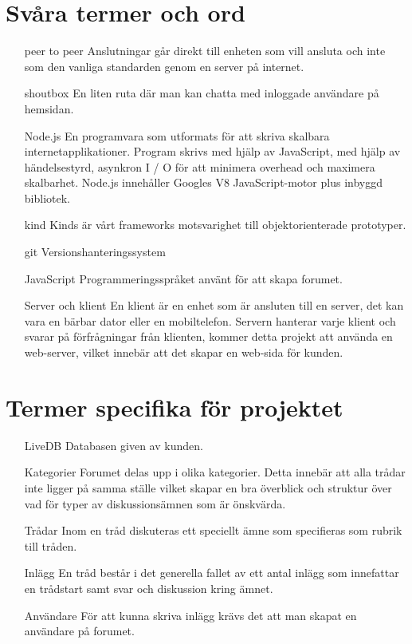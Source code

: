 \documentclass[a4paper, 12pt, titlepage]{article}
\begin{document}
\section{Svåra termer och ord}

\begin{itemize}
	\item[peer to peer] Anslutningar går direkt till enheten som vill ansluta och inte som den vanliga standarden genom en server på internet.
	\item[shoutbox] En liten ruta där man kan chatta med inloggade användare på hemsidan.
	\item[Node.js] En programvara som utformats för att skriva skalbara internetapplikationer. Program skrivs med hjälp av JavaScript, med hjälp av händelsestyrd, asynkron I / O för att minimera overhead och maximera skalbarhet. Node.js innehåller Googles V8 JavaScript-motor plus inbyggd bibliotek.
	\item[kind] Kinds är vårt frameworks motsvarighet till objektorienterade prototyper.
	\item[git] Versionshanteringssystem	
	\item[JavaScript] Programmeringsspråket använt för att skapa forumet.
  	\item[Server och klient] En klient är en enhet som är ansluten till en server, det kan vara en bärbar dator eller en mobiltelefon. Servern hanterar varje klient och svarar på förfrågningar från klienten, kommer detta projekt att använda en web-server, vilket innebär att det skapar en web-sida för kunden.

\end{itemize}

\section{Termer specifika för projektet}

\begin{itemize}
	\item[LiveDB] Databasen given av kunden.
	\item [Kategorier] Forumet delas upp i olika kategorier. Detta innebär att alla trådar inte ligger på samma ställe vilket skapar en bra överblick och struktur över vad för typer av diskussionsämnen som är önskvärda.
	\item [Trådar] Inom en tråd diskuteras ett speciellt ämne som specifieras som rubrik till tråden.
	\item [Inlägg] En tråd består i det generella fallet av ett antal inlägg som innefattar en trådstart samt svar och diskussion kring ämnet.
	\item [Användare] För att kunna skriva inlägg krävs det att man skapat en
användare på forumet.
	
\end{itemize}
\end{document}
